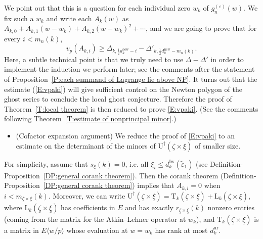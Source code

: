 \documentclass[12pt]{amsart}
\theoremstyle{definition}
\numberwithin{equation}{subsection}
\def\rmL{\mathrm{L}}
\def\rmU{\mathrm{U}}
\def\rmT{\mathrm{T}}
\newcommand{\new}{\mathrm{new}}
\newcommand{\Iw}{\mathrm{Iw}}
\newcommand{\ur}{\mathrm{ur}}
\begin{document}
We point out that this is a question for each individual zero $w_k$ of $g_n^{(\varepsilon)}(w)$.
 We fix such a $w_k$ and write each $A_k(w)$ as $A_{k,0} + A_{k,1}(w-w_k) + A_{k,2}(w-w_k)^2+\cdots$, and we are going to prove that for every $i< m_n(k)$,
\begin{equation}
\label{E:vpaki}
v_p(A_{k,i}) \geq \Delta_{k, \frac 12d_k^\new - i} - \Delta'_{k, \frac 12d_k^\new-m_n(k)}.
\end{equation}
Here, a subtle technical point is that we truly need to use $\Delta - \Delta'$ in order to implement the induction we perform later; see the comments after the statement of Proposition~\ref{P:each summand of Lagrange lie above NP}. It turns out that the estimate (\ref{E:vpaki}) will give sufficient control on the Newton polygon of the ghost series to conclude the local ghost conjecture. Therefore the proof of Theorem~\ref{T:local theorem} is then reduced to prove \eqref{E:vpaki}. (See the comments following Theorem~\ref{T:estimate of nonprincipal minor}.)
\begin{itemize}
\item [\underline{Step II}:] (Cofactor expansion argument) We reduce the proof of \eqref{E:vpaki} to an estimate on the determinant of the minors of $\rmU^\dagger(\underline \zeta \times \underline \xi)$ of smaller size.
\end{itemize}

For simplicity, assume that $s_{\underline \xi}(k) =0$, i.e. all $\xi_i \leq d_k^\Iw(\tilde \varepsilon_1)$ (see Definition-Proposition~\ref{DP:general corank theorem}). 
Then the corank theorem (Definition-Proposition~\ref{DP:general corank theorem}) implies that $A_{k,i} =0$ when $i < m_{\underline \zeta \times \underline \xi}(k)$.  
Moreover, we can write $\rmU^\dagger(\underline \zeta \times \underline \xi) = \rmT_k(\underline \zeta \times \underline \xi) + \rmL_k(\underline \zeta \times \underline \xi)$, where $\rmL_k(\underline \zeta \times \underline \xi)$ has coefficients in $E$ and has exactly $r_{\underline \zeta \times \underline \xi}(k)$ nonzero entries (coming from the matrix for the Atkin--Lehner operator at $w_k$), and $\rmT_k(\underline \zeta \times \underline \xi)$ is a matrix in $E\langle w/p\rangle$ whose evaluation at $w=w_k$ has rank at most $d_k^\ur$.
\end{document}
